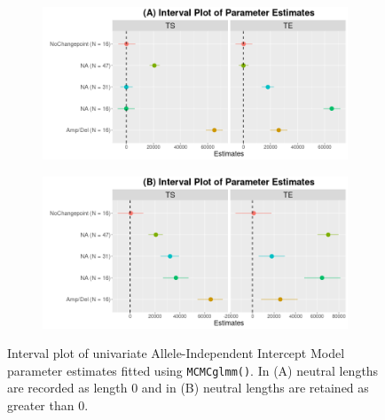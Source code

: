 \begin{figure}[!htb]
\vspace{0.5cm}
     \begin{subfigure}[t]{.49\textwidth}
      \centering
      \includegraphics[width = 1\textwidth]{../figures/Chapter_5/Univariate_MCMC_7_AI_Interval.png}
    \end{subfigure}%
     \begin{subfigure}[t]{.49\textwidth}
      \centering
       \includegraphics[width = 1\textwidth]{../figures/Chapter_5/Univariate_MCMC_7_Neut_AI_Interval.png}
    \end{subfigure} 
     \caption[Interval plot of univariate Allele-Independent Intercept Model parameter estimates fitted using \texttt{MCMCglmm()}.]{Interval plot of univariate Allele-Independent Intercept Model parameter estimates fitted using \texttt{MCMCglmm()}. In (A) neutral lengths are recorded as length 0 and in (B) neutral lengths are retained as greater than 0.}
\end{figure}

